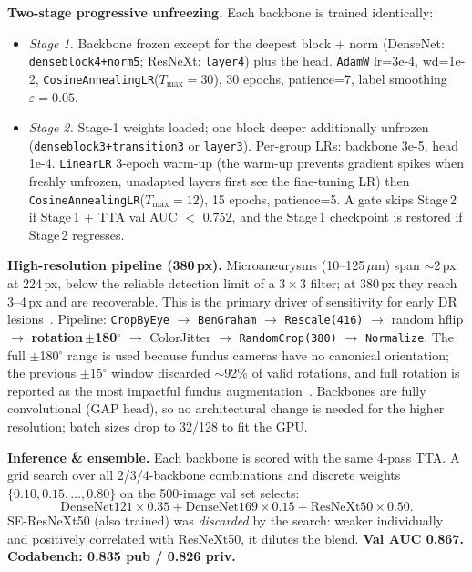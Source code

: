 \documentclass[a4paper, 10pt, twocolumn]{article}
\begin{document}
\textbf{Two-stage progressive unfreezing.} Each backbone is trained
identically:
\begin{itemize}
  \item \emph{Stage 1.} Backbone frozen except for the deepest block + norm
    (DenseNet: \texttt{denseblock4+norm5}; ResNeXt: \texttt{layer4})
    plus the head. \texttt{AdamW} lr=3e-4, wd=1e-2,
    \texttt{CosineAnnealingLR}($T_{\max}{=}30$), 30 epochs, patience=7,
    label smoothing $\varepsilon{=}0.05$.
  \item \emph{Stage 2.} Stage-1 weights loaded; one block deeper additionally
    unfrozen (\texttt{denseblock3+transition3} or \texttt{layer3}).
    Per-group LRs: backbone 3e-5, head 1e-4. \texttt{LinearLR} 3-epoch
    warm-up (the warm-up prevents gradient spikes when freshly unfrozen,
    unadapted layers first see the fine-tuning LR) then
    \texttt{CosineAnnealingLR}($T_{\max}{=}12$), 15 epochs, patience=5.
    A gate skips Stage\,2 if Stage\,1 + TTA val AUC $<$ 0.752, and the
    Stage\,1 checkpoint is restored if Stage\,2 regresses.
\end{itemize}

\textbf{High-resolution pipeline (380\,px).} Microaneurysms (10--125\,$\mu$m)
span $\sim$2\,px at 224\,px, below the reliable detection limit of a
$3{\times}3$ filter; at 380\,px they reach 3--4\,px and are recoverable.
This is the primary driver of sensitivity for early DR
lesions~\cite{abramoff2018pivotal}. Pipeline: \texttt{CropByEye} $\to$
\texttt{BenGraham} $\to$ \texttt{Rescale(416)} $\to$ random hflip $\to$
\textbf{rotation\,$\pm$180$^\circ$} $\to$ ColorJitter $\to$
\texttt{RandomCrop(380)} $\to$ \texttt{Normalize}. The full $\pm$180$^\circ$
range is used because fundus cameras have no canonical orientation; the
previous $\pm$15$^\circ$ window discarded $\sim$92\% of valid rotations,
and full rotation is reported as the most impactful fundus
augmentation~\cite{graham2015kaggle}. Backbones are fully convolutional
(GAP head), so no architectural change is needed for the higher resolution;
batch sizes drop to 32/128 to fit the GPU.

\textbf{Inference \& ensemble.} Each backbone is scored with the same
4-pass TTA. A grid search over all 2/3/4-backbone combinations and
discrete weights $\{0.10,0.15,\dots,0.80\}$ on the 500-image val set
selects:
\[
\text{DenseNet121}{\times}0.35 + \text{DenseNet169}{\times}0.15
   + \text{ResNeXt50}{\times}0.50 .
\]
SE-ResNeXt50 (also trained) was \emph{discarded} by the search: weaker
individually and positively correlated with ResNeXt50, it dilutes the
blend. \textbf{Val AUC 0.867. Codabench: 0.835 pub / 0.826 priv.}
\end{document}
